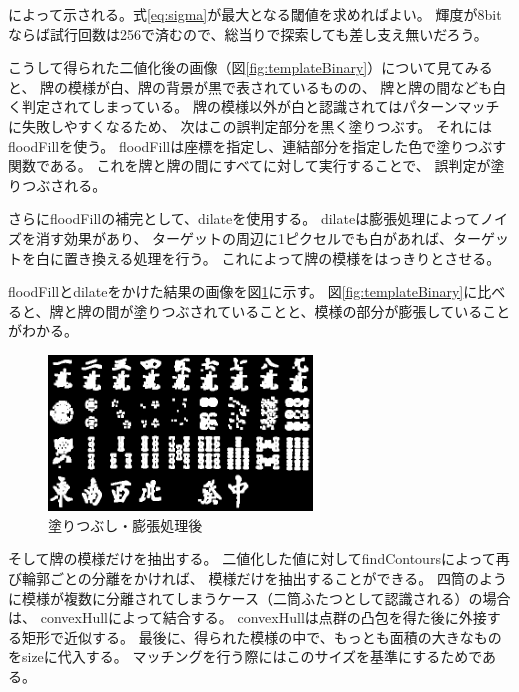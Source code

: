 \documentclass{jsarticle}
\begin{document}
\begin{multicols}{2}
によって示される。式\ref{eq:sigma}が最大となる閾値を求めればよい。
輝度が8bitならば試行回数は256で済むので、総当りで探索しても差し支え無いだろう。

%

こうして得られた二値化後の画像（図\ref{fig:templateBinary}）について見てみると、
牌の模様が白、牌の背景が黒で表されているものの、
牌と牌の間なども白く判定されてしまっている。
牌の模様以外が白と認識されてはパターンマッチに失敗しやすくなるため、
次はこの誤判定部分を黒く塗りつぶす。
それにはfloodFillを使う。
floodFillは座標を指定し、連結部分を指定した色で塗りつぶす関数である。
これを牌と牌の間にすべてに対して実行することで、
誤判定が塗りつぶされる。

さらにfloodFillの補完として、dilateを使用する。
dilateは膨張処理によってノイズを消す効果があり、
ターゲットの周辺に1ピクセルでも白があれば、ターゲットを白に置き換える処理を行う。
これによって牌の模様をはっきりとさせる。

floodFillとdilateをかけた結果の画像を図\ref{fig:templateFill}に示す。
図\ref{fig:templateBinary}に比べると、牌と牌の間が塗りつぶされていることと、模様の部分が膨張していることがわかる。

\begin{figure}[H]
  \begin{center}
    \includegraphics[clip,width=7.0cm]{./img/template_fill.png}
    \caption{塗りつぶし・膨張処理後}
    \label{fig:templateFill}
  \end{center}
\end{figure}

そして牌の模様だけを抽出する。
二値化した値に対してfindContoursによって再び輪郭ごとの分離をかければ、
模様だけを抽出することができる。
四筒のように模様が複数に分離されてしまうケース（二筒ふたつとして認識される）の場合は、
convexHullによって結合する。
convexHullは点群の凸包を得た後に外接する矩形で近似する。
最後に、得られた模様の中で、もっとも面積の大きなものをsizeに代入する。
マッチングを行う際にはこのサイズを基準にするためである。


\end{multicols}
\end{document}
